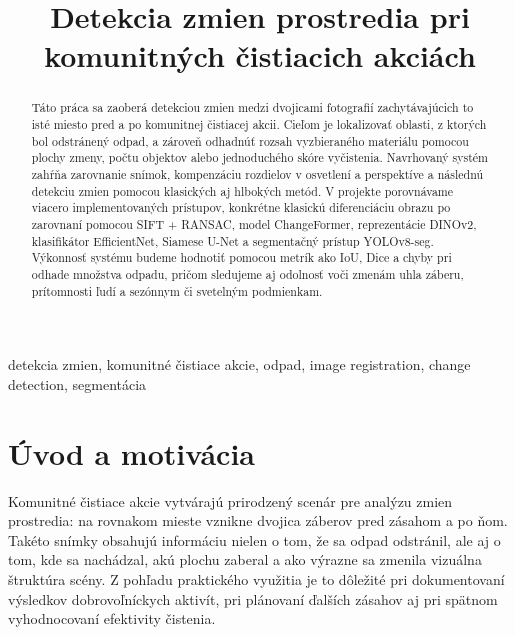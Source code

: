 \documentclass[conference]{IEEEtran}
\begin{document}
\title{Detekcia zmien prostredia pri komunitných čistiacich akciách}
\author{
\and
{}
}
\maketitle

\begin{abstract}
Táto práca sa zaoberá detekciou zmien medzi dvojicami fotografií zachytávajúcich to isté miesto pred a po komunitnej čistiacej akcii. Cieľom je lokalizovať oblasti, z ktorých bol odstránený odpad, a zároveň odhadnúť rozsah vyzbieraného materiálu pomocou plochy zmeny, počtu objektov alebo jednoduchého skóre vyčistenia. Navrhovaný systém zahŕňa zarovnanie snímok, kompenzáciu rozdielov v osvetlení a perspektíve a následnú detekciu zmien pomocou klasických aj hlbokých metód. V projekte porovnávame viacero implementovaných prístupov, konkrétne klasickú diferenciáciu obrazu po zarovnaní pomocou SIFT + RANSAC, model ChangeFormer, reprezentácie DINOv2, klasifikátor EfficientNet, Siamese U-Net a segmentačný prístup YOLOv8-seg. Výkonnosť systému budeme hodnotiť pomocou metrík ako IoU, Dice a chyby pri odhade množstva odpadu, pričom sledujeme aj odolnosť voči zmenám uhla záberu, prítomnosti ľudí a sezónnym či svetelným podmienkam.
\end{abstract}

\begin{IEEEkeywords}
detekcia zmien, komunitné čistiace akcie, odpad, image registration, change detection, segmentácia
\end{IEEEkeywords}

\section{Úvod a motivácia}
Komunitné čistiace akcie vytvárajú prirodzený scenár pre analýzu zmien prostredia: na rovnakom mieste vznikne dvojica záberov pred zásahom a po ňom. Takéto snímky obsahujú informáciu nielen o tom, že sa odpad odstránil, ale aj o tom, kde sa nachádzal, akú plochu zaberal a ako výrazne sa zmenila vizuálna štruktúra scény. Z pohľadu praktického využitia je to dôležité pri dokumentovaní výsledkov dobrovoľníckych aktivít, pri plánovaní ďalších zásahov aj pri spätnom vyhodnocovaní efektivity čistenia.
\end{document}

